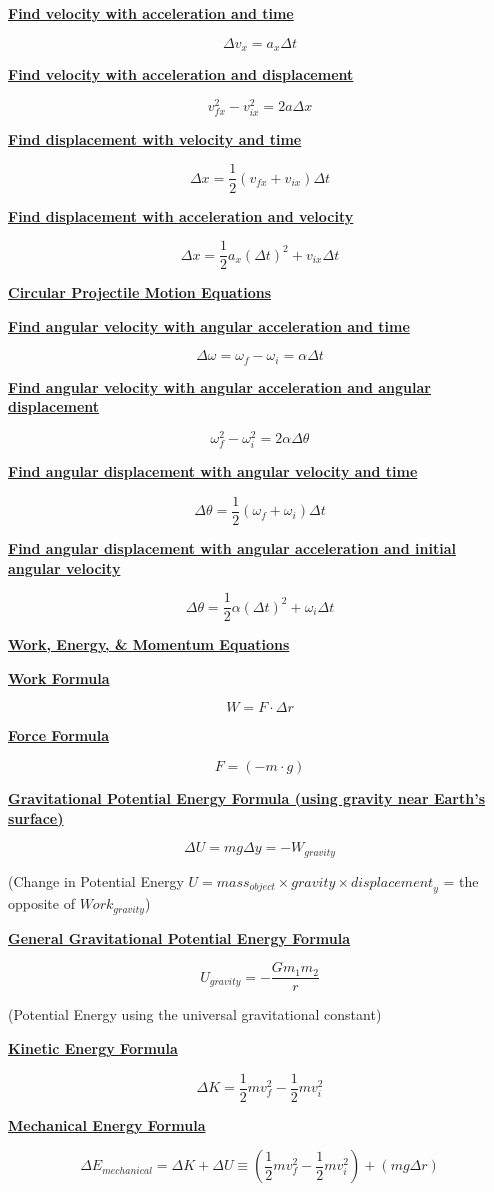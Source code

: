 \documentclass[12pt, letterpaper]{article}
\begin{document}
\normalsize{\centerline{\textbf{\underline{Find velocity with acceleration and time}}}}
\[\Delta v_x = a_x \Delta t\]

\centerline{\textbf{\underline{Find velocity with acceleration and displacement}}}
\[v^2_{fx} - v^2_{ix} = 2a \Delta x\]

\centerline{\textbf{\underline{Find displacement with velocity and time}}}
\[\Delta x = \frac{1}{2} (v_{fx} + v_{ix}) \Delta t\]

\centerline{\textbf{\underline{Find displacement with acceleration and velocity}}}
\[\Delta x = \frac{1}{2} a_x (\Delta t)^2 + v_{ix} \Delta t\]

\newpage

\Large{\centerline{\textbf{\underline{Circular Projectile Motion Equations}}}}
\vspace{1em}

\normalsize{\centerline{\textbf{\underline{Find angular velocity with angular acceleration and time}}}}
\[\Delta \omega = \omega_f - \omega_i = \alpha \Delta t\]

\centerline{\textbf{\underline{Find angular velocity with angular acceleration and angular displacement}}}
\[\omega^2_{f} - \omega^2_{i} = 2 \alpha \Delta \theta \]

\centerline{\textbf{\underline{Find angular displacement with angular velocity and time}}}
\[\Delta \theta = \frac{1}{2} (\omega_{f} + \omega_{i}) \Delta t\]

\centerline{\textbf{\underline{Find angular displacement with angular acceleration and initial angular velocity}}}
\[\Delta \theta = \frac{1}{2} \alpha (\Delta t)^2 + \omega_{i} \Delta t\]

\newpage


\Large{\centerline{\textbf{\underline{Work, Energy, \& Momentum Equations}}}}
\vspace{1em}

\normalsize{\centerline{\textbf{\underline{Work Formula}}}}
\[W = F \cdot \Delta r\]

\normalsize{\centerline{\textbf{\underline{Force Formula}}}}
\[F = (-m \cdot g)\]

\normalsize{\centerline{\textbf{\underline{Gravitational Potential Energy Formula (using gravity near Earth's surface)}}}}
\[\Delta U = mg \Delta y = -W_{gravity}\]
\small{\centerline{(Change in Potential Energy $U = {mass}_{object} \times {gravity} \times {displacement}_y$ = the opposite of ${Work}_{gravity}$)}}
\vspace{0.1em}

\normalsize{\centerline{\textbf{\underline{General Gravitational Potential Energy Formula}}}}
\[U_{gravity} = - \frac{G m_1 m_2}{r}\]
\small{\centerline{(Potential Energy using the universal gravitational constant)}}
\vspace{0.1em}

\normalsize{\centerline{\textbf{\underline{Kinetic Energy Formula}}}}
\[\Delta K = \frac{1}{2}mv^2_f - \frac{1}{2}mv^2_i\]

\normalsize{\centerline{\textbf{\underline{Mechanical Energy Formula}}}}
\[\Delta E_{mechanical} = \Delta K + \Delta U \equiv (\frac{1}{2}mv^2_f - \frac{1}{2}mv^2_i) + (mg \Delta r)\]
\end{document}
